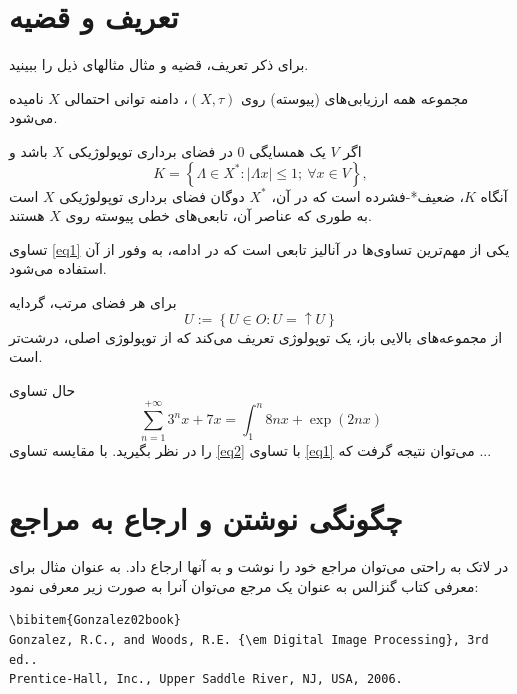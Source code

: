 \section{تعریف و قضیه}
برای ذکر تعریف، قضیه و مثال مثالهای ذیل را ببینید.
\begin{definition}
مجموعه همه ارزیابی‌های  (پیوسته)  روی $(X,\tau)$، دامنه توانی احتمالی
$ X $
نامیده می‌شود.
\end{definition}
\begin{theorem}
اگر $ V $ یک همسایگی $ 0 $ در فضای برداری 
 توپولوژیکی $ X $ باشد و 
\begin{equation}\label{eq1}
K=\left\lbrace \Lambda \in X^{*}:|\Lambda x|\leqslant 1 ; \ \forall x\in V\right\rbrace,
\end{equation}
آنگاه $ K $،  ضعیف*-فشرده است که در آن، $ X^{*} $ دوگان
 فضای برداری توپولوژیکی $ X $ است به ‌طوری که عناصر آن،  تابعی‌های 
خطی پیوسته
 روی $X$ هستند.
\end{theorem}
تساوی \eqref{eq1} یکی از مهم‌ترین تساوی‌ها در آنالیز تابعی است که در ادامه، به وفور از آن استفاده می‌شود.
\begin{example}
برای هر فضای مرتب، گردایه 
$$U:=\left\lbrace U\in O: U=\uparrow U\right\rbrace $$
از مجموعه‌های بالایی باز، یک توپولوژی تعریف می‌کند که از توپولوژی اصلی، درشت‌تر  است.
\end{example}
حال تساوی 
\begin{equation}\label{eq2}
\sum_{n=1}^{+\infty} 3^{n}x+7x=\int_{1}^{n}8nx+\exp{(2nx)}
\end{equation}
را در نظر بگیرید. با مقایسه تساوی \eqref{eq2} با تساوی \eqref{eq1} می‌توان نتیجه گرفت که ...


\section{چگونگی نوشتن و ارجاع به مراجع}
\label{Sec:Ref}


در لاتک به راحتی می‌توان مراجع خود را نوشت و به آنها ارجاع داد. به عنوان مثال برای معرفی کتاب گنزالس \cite{Gonzalez02book} به عنوان یک مرجع می‌توان آنرا به صورت زیر معرفی نمود:

\singlespacing
\begin{LTR}
\begin{verbatim}
\bibitem{Gonzalez02book}
Gonzalez, R.C., and Woods, R.E. {\em Digital Image Processing}, 3rd ed..
Prentice-Hall, Inc., Upper Saddle River, NJ, USA, 2006.
\end{verbatim}
\end{LTR}
\doublespacing

